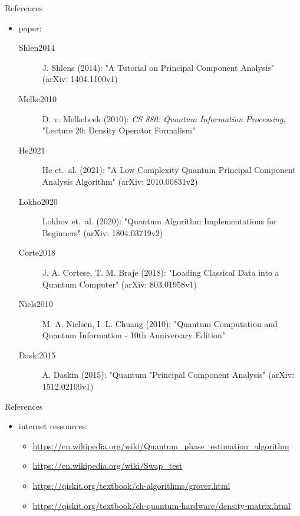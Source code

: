 \begin{frame}{References}
  \begin{minipage}{1.0\textwidth}
    \begin{itemize}
      \item paper:
      \begin{description}
        \item [\text{[}Shlen2014\text{]}] J. Shlens (2014): "A Tutorial on Principal Component Analysis" (arXiv: 1404.1100v1)
        \item [\text{[}Melke2010\text{]}] D. v. Melkebeek (2010): \emph{CS 880: Quantum Information Processing}, "Lecture 20: Density Operator Formalism"
        \item [\text{[}He2021\text{]}] He et.~al. (2021): "A Low Complexity Quantum Principal Component Analysis Algorithm" (arXiv: 2010.00831v2)
        \item [\text{[}Lokho2020\text{]}] Lokhov et.~al. (2020): "Quantum Algorithm Implementations for Beginners" (arXiv: 1804.03719v2)
        \item [\text{[}Corte2018\text{]}] J. A. Cortese, T. M. Braje (2018): "Loading Classical Data into a Quantum Computer" (arXiv: 803.01958v1)
        \item [\text{[}Niels2010\text{]}] M. A. Nielsen, I. L. Chuang (2010): "Quantum Computation and Quantum Information - 10th Anniversary Edition"
        \item [Daski2015] A. Daskin (2015): "Quantum "Principal Component Analysis" (arXiv: 1512.02109v1)
      \end{description}
    \end{itemize}
  \end{minipage}
\end{frame}
\begin{frame}{References}
  \begin{minipage}{1.0\textwidth}
    \begin{itemize}
      \item internet ressources:
      \begin{itemize}
        \item \url{https://en.wikipedia.org/wiki/Quantum_phase_estimation_algorithm}
        \item \url{https://en.wikipedia.org/wiki/Swap_test}
        \item \url{https://qiskit.org/textbook/ch-algorithms/grover.html}
        \item \url{https://qiskit.org/textbook/ch-quantum-hardware/density-matrix.html}
      \end{itemize}
    \end{itemize}
  \end{minipage}
\end{frame}
